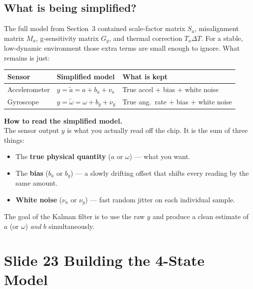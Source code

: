 \documentclass[12pt, a4paper]{article}
\begin{document}
\subsection*{What is being simplified?}

The full model from Section~3 contained scale-factor matrix $S_a$,
misalignment matrix $M_a$, g-sensitivity matrix $G_g$, and thermal
correction $T_a \Delta T$.
For a stable, low-dynamic environment those extra terms are small
enough to ignore.
What remains is just:

\begin{center}
\renewcommand{\arraystretch}{1.5}
\begin{tabular}{lll}
  \toprule
  \textbf{Sensor} & \textbf{Simplified model} & \textbf{What is kept} \\
  \midrule
  Accelerometer & $y = \tilde{a} = a + b_a + \nu_a$ &
      True accel + bias + white noise \\
  Gyroscope     & $y = \tilde{\omega} = \omega + b_g + \nu_g$ &
      True ang.\ rate + bias + white noise \\
  \bottomrule
\end{tabular}
\end{center}

\begin{notebox}
  \textbf{How to read the simplified model.}\\
  The sensor output $y$ is what you actually read off the chip.
  It is the sum of three things:
  \begin{itemize}[leftmargin=1.4em, topsep=2pt]
    \item The \textbf{true physical quantity} ($a$ or $\omega$) ---
          what you want.
    \item The \textbf{bias} ($b_a$ or $b_g$) --- a slowly drifting
          offset that shifts every reading by the same amount.
    \item \textbf{White noise} ($\nu_a$ or $\nu_g$) --- fast random
          jitter on each individual sample.
  \end{itemize}
  The goal of the Kalman filter is to use the raw $y$ and produce a
  clean estimate of $a$ (or $\omega$) \emph{and} $b$ simultaneously.
\end{notebox}


\clearpage
\section*{Slide 23 \quad Building the 4-State Model}
\end{document}
